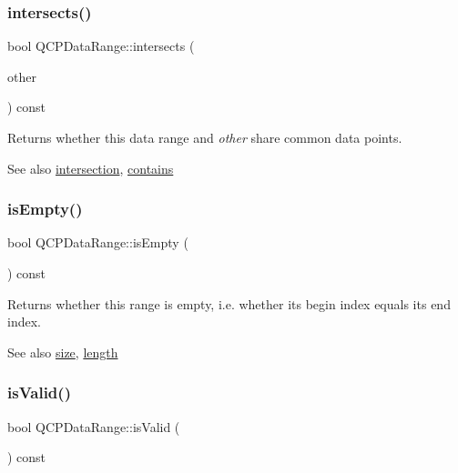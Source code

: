\subsubsection{\texorpdfstring{intersects()}{intersects()}}
{\footnotesize\ttfamily bool Q\+C\+P\+Data\+Range\+::intersects (\begin{DoxyParamCaption}\item[{const \hyperlink{class_q_c_p_data_range}{Q\+C\+P\+Data\+Range} \&}]{other }\end{DoxyParamCaption}) const}

Returns whether this data range and {\itshape other} share common data points.

\begin{DoxySeeAlso}{See also}
\hyperlink{class_q_c_p_data_range_a84e1e03129dd52528efb4bac18d30183}{intersection}, \hyperlink{class_q_c_p_data_range_a13ca398776374a3160aa85433718b812}{contains} 
\end{DoxySeeAlso}
\mbox{\label{class_q_c_p_data_range_ac32e53fc05d6cd2eac96b96a7265d3b8}} 
\subsubsection{\texorpdfstring{is\+Empty()}{isEmpty()}}
{\footnotesize\ttfamily bool Q\+C\+P\+Data\+Range\+::is\+Empty (\begin{DoxyParamCaption}{ }\end{DoxyParamCaption}) const\hspace{0.3cm}{\ttfamily [inline]}}

Returns whether this range is empty, i.\+e. whether its begin index equals its end index.

\begin{DoxySeeAlso}{See also}
\hyperlink{class_q_c_p_data_range_ac6af055e509d1b691c244954ff1c5887}{size}, \hyperlink{class_q_c_p_data_range_a1e7836058f755c6ab9f11996477b7150}{length} 
\end{DoxySeeAlso}
\mbox{\label{class_q_c_p_data_range_aae53a37472212dca0a7939963e20dba0}} 
\subsubsection{\texorpdfstring{is\+Valid()}{isValid()}}
{\footnotesize\ttfamily bool Q\+C\+P\+Data\+Range\+::is\+Valid (\begin{DoxyParamCaption}{ }\end{DoxyParamCaption}) const\hspace{0.3cm}{\ttfamily [inline]}}

